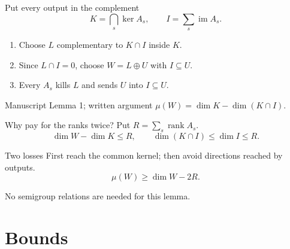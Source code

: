 \documentclass{beamer}
\begin{document}
\begin{frame}{Put every output in the complement}
\[
K=\bigcap_s\ker A_s,\qquad I=\sum_s\operatorname{im}A_s.
\]
\begin{enumerate}
\item Choose $L$ complementary to $K\cap I$ inside $K$.
\item Since $L\cap I=0$, choose $W=L\oplus U$ with $I\subseteq U$.
\item Every $A_s$ kills $L$ and sends $U$ into $I\subseteq U$.
\end{enumerate}
\begin{block}{Manuscript Lemma 1; written argument}
$\mu(W)=\dim K-\dim(K\cap I)$.
\end{block}
\end{frame}
\begin{frame}{Why pay for the ranks twice?}
Put $R=\sum_s\operatorname{rank}A_s$.
\[
\dim W-\dim K\leq R,\qquad\dim(K\cap I)\leq\dim I\leq R.
\]
\begin{block}{Two losses}
First reach the common kernel; then avoid directions reached by outputs.
\[
\mu(W)\geq\dim W-2R.
\]
\end{block}
No semigroup relations are needed for this lemma.
\end{frame}
\section{Bounds}
\end{document}

